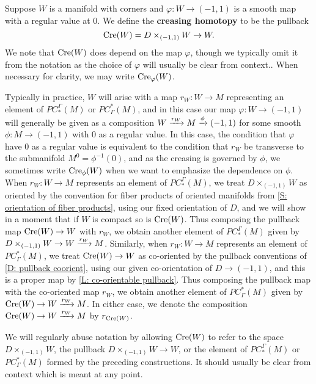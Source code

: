 \begin{definition}
	Suppose $W$ is a manifold with corners and $\varphi \colon W \to (-1,1)$ is a smooth map with a regular value at $0$.
	We define the \textbf{creasing homotopy} to be the pullback
	$$\mathrm{Cre}(W) = D\times_{(-1,1)} W \to W.$$
	We note that $\mathrm{Cre}(W)$ does depend on the map $\varphi$, though we typically omit it from the notation as the choice of $\varphi$ will usually be clear from context..
	When necessary for clarity, we may write $\mathrm{Cre}_\varphi(W)$.

	Typically in practice, $W$ will arise with a map $r_W \colon W \to M$ representing an element of $PC_*^\Gamma(M)$ or $PC^*_\Gamma(M)$, and in this case our map $\varphi \colon W \to (-1,1)$ will generally be given as a composition $W \xrightarrow{r_W}M \xrightarrow{\phi} (-1,1)$ for some smooth $\phi \colon M \to (-1,1)$ with $0$ as a regular value.
	In this case, the condition that $\varphi$ have $0$ as a regular value is equivalent to the condition that $r_W$ be transverse to the submanifold $M^0 = \phi^{-1}(0)$, and as the creasing is governed by $\phi$, we sometimes write $\mathrm{Cre}_\phi(W)$ when we want to emphasize the dependence on $\phi$.
	When $r_W \colon W \to M$ represents an element of $PC_*^\Gamma(M)$, we treat $D\times_{(-1,1)} W$ as oriented by the convention for fiber products of oriented manifolds from \cref{S: orientation of fiber products}, using our fixed orientation of $D$, and we will show in a moment that if $W$ is compact so is $\mathrm{Cre}(W)$.
	Thus composing the pullback map $\mathrm{Cre}(W) \to W$ with $r_W$, we obtain another element of $PC_*^\Gamma(M)$ given by $D\times_{(-1,1)} W \to W \xrightarrow{r_W}M$.
	Similarly, when $r_W \colon W \to M$ represents an element of $PC^*_\Gamma(M)$, we treat $\mathrm{Cre}(W) \to W$ as co-oriented by the pullback conventions of \cref{D: pullback coorient}, using our given co-orientation of $D \to (-1,1)$, and this is a proper map by \cref{L: co-orientable pullback}.
	Thus composing the pullback map with the co-oriented map $r_W$, we obtain another element of $PC^*_\Gamma(M)$ given by $\mathrm{Cre}(W) \to W \xrightarrow{r_W} M$.
	In either case, we denote the composition $\mathrm{Cre}(W) \to W \xrightarrow{r_W}M$ by $r_{\mathrm{Cre}(W)}$.

	We will regularly abuse notation by allowing $\mathrm{Cre}(W)$ to refer to the space $D\times_{(-1,1)} W$, the pullback $D\times_{(-1,1)} W \to W$, or the element of $PC_*^\Gamma(M)$ or $PC^*_\Gamma(M)$ formed by the preceding constructions.
	It should usually be clear from context which is meant at any point.
\end{definition}

